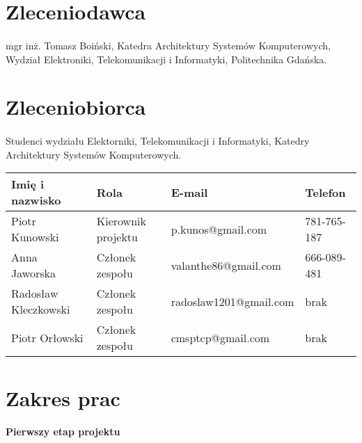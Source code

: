 \documentclass[a4paper,10pt]{article}
\begin{document}
\section{Zleceniodawca}
\paragraph{} mgr inż. Tomasz Boiński, Katedra Architektury Systemów Komputerowych, Wydział Elektroniki, Telekomunikacji i Informatyki, Politechnika Gdańska.


\section{Zleceniobiorca}
\paragraph{} Studenci wydziału Elektorniki, Telekomunikacji i Informatyki, Katedry Architektury Systemów Komputerowych.
\begin{center}
\begin{tabular}{|l|l|l|l|}
\hline
\textbf{Imię i nazwisko} & \textbf{Rola} & \textbf{E-mail} & \textbf{Telefon} \tabularnewline \hline
Piotr Kunowski & Kierownik projektu & p.kunos@gmail.com & 781-765-187 \tabularnewline \hline
Anna Jaworska & Członek zespołu & valanthe86@gmail.com & 666-089-481 \tabularnewline \hline
Radosław Kleczkowski & Członek zespołu & radoslaw1201@gmail.com & brak \tabularnewline \hline
Piotr Orłowski & Członek zespołu & cmsptcp@gmail.com & brak \tabularnewline \hline
\end{tabular}
\end{center}

\section{Zakres prac}

\paragraph{} \textbf{Pierwszy etap projektu}
\end{document}
